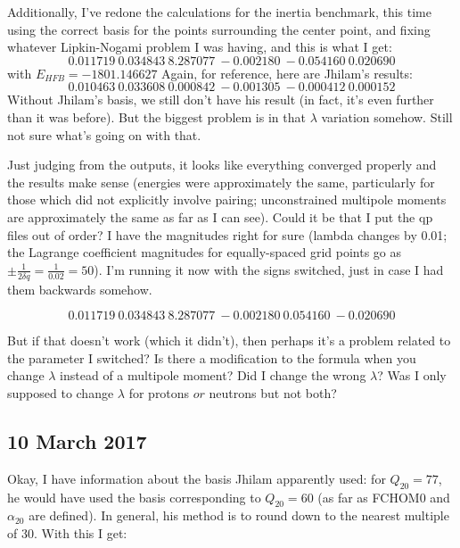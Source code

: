 \documentclass[]{report}
\begin{document}
Additionally, I've redone the calculations for the inertia benchmark, this time using the correct basis for the points surrounding the center point, and fixing whatever Lipkin-Nogami problem I was having, and this is what I get:
\begin{equation}
    0.011719\    0.034843\    8.287077\   -0.002180\   -0.054160\    0.020690
\end{equation}
\noindent with $E_{HFB}=-1801.146627$ Again, for reference, here are Jhilam's results:
\begin{equation}
   0.010463\    0.033608\    0.000842\   -0.001305\   -0.000412\    0.000152
\end{equation}
Without Jhilam's basis, we still don't have his result (in fact, it's even further than it was before). But the biggest problem is in that $\lambda$ variation somehow. Still not sure what's going on with that.

Just judging from the outputs, it looks like everything converged properly and the results make sense (energies were approximately the same, particularly for those which did not explicitly involve pairing; unconstrained multipole moments are approximately the same as far as I can see). Could it be that I put the qp files out of order? I have the magnitudes right for sure (lambda changes by 0.01; the Lagrange coefficient magnitudes for equally-spaced grid points go as $\pm\frac{1}{2\delta q} = \frac{1}{0.02}=50$). I'm running it now with the signs switched, just in case I had them backwards somehow. 

\begin{equation}
    0.011719\    0.034843\    8.287077\   -0.002180\    0.054160\   -0.020690
\end{equation}

\noindent But if that doesn't work (which it didn't), then perhaps it's a problem related to the parameter I switched? Is there a modification to the formula when you change $\lambda$ instead of a multipole moment? Did I change the wrong $\lambda$? Was I only supposed to change $\lambda$ for protons $\mathit{or}$ neutrons but not both?

\subsection*{10 March 2017}
Okay, I have information about the basis Jhilam apparently used: for $Q_{20}=77$, he would have used the basis corresponding to $Q_{20}=60$ (as far as FCHOM0 and $\alpha_{20}$ are defined). In general, his method is to round down to the nearest multiple of 30. With this I get:
\end{document}
